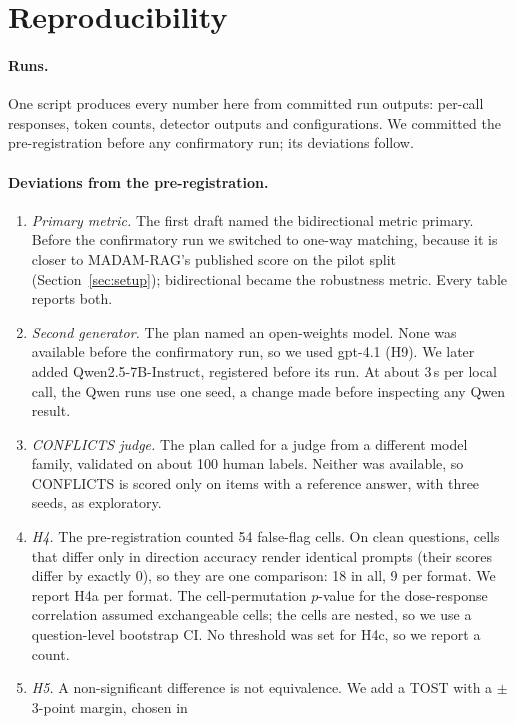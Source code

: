 \section{Reproducibility}
\label{app:repro}
\paragraph{Runs.} One script produces every number here from committed run outputs: per-call responses,
token counts, detector outputs and configurations. We committed the pre-registration before any confirmatory run;
its deviations follow.

\paragraph{Deviations from the pre-registration.}
\begin{enumerate}[leftmargin=*,itemsep=1pt,topsep=2pt]
\item \emph{Primary metric.} The first draft named the bidirectional metric primary. Before
the confirmatory run we switched to one-way matching, because it is closer to MADAM-RAG's published score on the pilot
split (Section~\ref{sec:setup}); bidirectional became the robustness metric. Every table reports both.
\item \emph{Second generator.} The plan named an open-weights model. None was available before the confirmatory run, so
we used gpt-4.1 (H9). We later added Qwen2.5-7B-Instruct, registered before its run. At about 3\,s per local
call, the Qwen runs use one seed, a change made before inspecting any Qwen result.
\item \emph{CONFLICTS judge.} The plan called for a judge from a different model family, validated on about 100 human
labels. Neither was available, so CONFLICTS is scored only on items with a reference answer,
with three seeds, as exploratory.
\item \emph{H4.} The pre-registration counted 54 false-flag cells. On clean questions, cells that differ only in
direction accuracy render identical prompts (their scores differ by exactly 0), so they are one comparison: 18 in
all, 9 per format. We report H4a per format. The cell-permutation $p$-value for the dose-response correlation assumed
exchangeable cells; the cells are nested, so we use a question-level bootstrap CI. No threshold was set
for H4c, so we report a count.
\item \emph{H5.} A non-significant difference is not equivalence. We add a TOST with a $\pm$3-point margin, chosen in

\end{enumerate}
